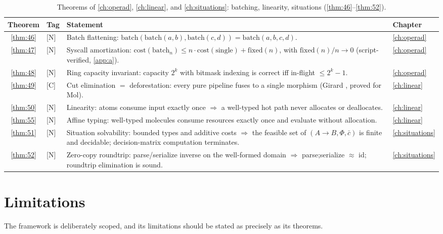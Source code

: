 \begin{table}[!htbp]
\centering
\caption{Theorems of \autoref{ch:operad}, \autoref{ch:linear}, and \autoref{ch:situations}: batching, linearity, situations (\autoref{thm:46}--\autoref{thm:52}).}
\label{tab:thm-operad-linear-situ}
\small
\begin{tabular}{@{}clp{7.2cm}l@{}}
\toprule
Theorem & Tag & Statement & Chapter\\
\midrule
\ref{thm:46} & [N] & Batch flattening: $\mathrm{batch} (\mathrm{batch} (a,b),\mathrm{batch} (c,d)) = \mathrm{batch} (a,b,c,d)$. & \autoref{ch:operad}\\
\ref{thm:47} & [N] & Syscall amortization: $\mathrm{cost} (\mathrm{batch}_n) \le n\cdot\mathrm{cost} (\mathrm{single}) + \mathrm{fixed} (n)$, with $\mathrm{fixed} (n)/n \to 0$ (script-verified, \autoref{app:a}). & \autoref{ch:operad}\\
\ref{thm:48} & [N] & Ring capacity invariant: capacity $2^k$ with bitmask indexing is correct iff in-flight $\le 2^k - 1$. & \autoref{ch:operad}\\
\ref{thm:49} & [C] & Cut elimination $=$ deforestation: every pure pipeline fuses to a single morphism (Girard \cite{girard}, proved for Mol). & \autoref{ch:linear}\\
\ref{thm:50} & [N] & Linearity: atoms consume input exactly once $\Rightarrow$ a well-typed hot path never allocates or deallocates. & \autoref{ch:linear}\\
\ref{thm:55} & [N] & Affine typing: well-typed molecules consume resources exactly once and evaluate without allocation. & \autoref{ch:linear}\\
\ref{thm:51} & [N] & Situation solvability: bounded types and additive costs $\Rightarrow$ the feasible set of $(A\to B,\Phi,\bar c)$ is finite and decidable; decision-matrix computation terminates. & \autoref{ch:situations}\\
\ref{thm:52} & [N] & Zero-copy roundtrip: parse/serialize inverse on the well-formed domain $\Rightarrow$ parse;serialize $\approx$ id; roundtrip elimination is sound. & \autoref{ch:situations}\\
\bottomrule
\end{tabular}
\end{table}

\section{Limitations}
The framework is deliberately scoped, and its limitations should be stated as precisely as its theorems.

